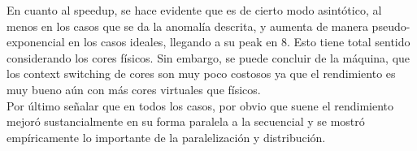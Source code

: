 \documentclass[letterpaper,10pt]{article}
\begin{document}
En cuanto al speedup, se hace evidente que es de cierto modo asintótico, al menos en los casos que se da la anomalía descrita, y aumenta de manera pseudo-exponencial en los casos ideales, llegando a su peak en 8. Esto tiene total sentido considerando los cores físicos. Sin embargo, se puede concluir de la máquina, que los context switching de cores son muy poco costosos ya que el rendimiento es muy bueno aún con más cores virtuales que físicos.\\

Por último señalar que en todos los casos, por obvio que suene el rendimiento mejoró sustancialmente en su forma paralela a la secuencial y se mostró empíricamente lo importante de la paralelización y distribución.
\end{document}
